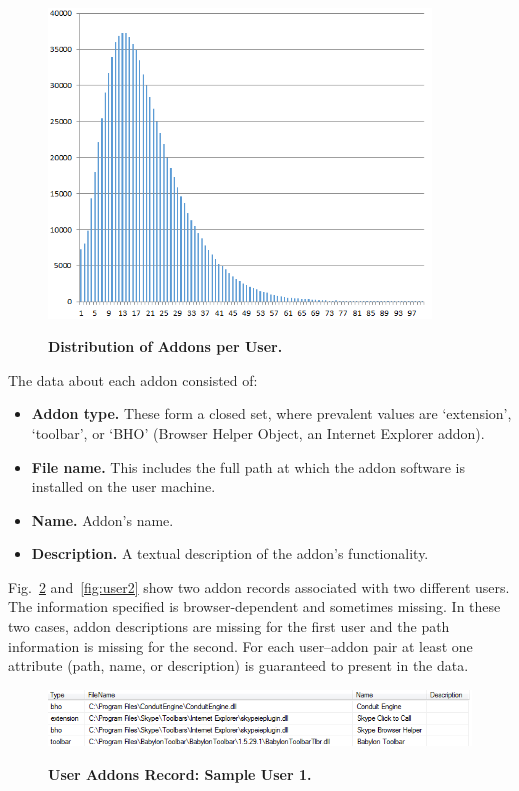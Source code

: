 \documentclass[10pt,letterpaper]{article}
\begin{document}
\begin{figure}[!h]
\caption{{\bf Distribution of Addons per User.}}
\includegraphics[width=4in]{figures/user_addons_histogram1.png}
\label{fig:distr}
\end{figure}

The data about each addon consisted of:  
\begin{itemize}
    \item {\bf Addon type.} These form a closed set, where prevalent values are `extension', `toolbar', or `BHO' (Browser Helper Object, an Internet Explorer addon). 
    \item {\bf File name.} This includes the full path at which the addon software is installed on the user machine. 
    \item {\bf Name.} Addon's name.
    \item {\bf Description.} A textual description of the addon's functionality.
\end{itemize}

Fig.~\ref{fig:user1} and~\ref{fig:user2} show two addon records associated with two different users. The information specified is browser-dependent and sometimes missing. In these two cases, addon descriptions are missing for the first user and the path information is missing for the second. For each user--addon pair at least one attribute (path, name, or description) is guaranteed to present in the data. 

\begin{figure}[!h]
\caption{{\bf User Addons Record: Sample User 1.}}
\includegraphics[width=\linewidth]{figures/db_addons_snapshot.png}
\label{fig:user1}
\end{figure}
\end{document}
